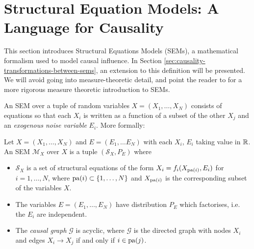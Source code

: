 

\section{Structural Equation Models: A Language for Causality}\label{sec:causality-structural-equation-models}

This section introduces Structural Equations Models (SEMs), a mathematical formalism used to model causal influence. In Section \ref{sec:causality-transformations-between-sems}, an extension to this definition will be presented.
We will avoid going into measure-theoretic detail, and point the reader to \cite{bongers2016structural} for a more rigorous measure theoretic introduction to SEMs.


An SEM over a tuple of random variables $X = (X_1, \ldots, X_N)$ consists of equations so that each $X_i$ is written as a function of a subset of the other $X_j$ and an \emph{exogenous noise variable} $E_i$. More formally:

\medskip

\begin{definition}\label{def:causality-classical-sem}
Let $X = (X_1, \ldots, X_N)$ and $E = (E_1, \ldots E_N)$ with each $X_i$, $E_i$ taking value in $\mathbb{R}$. An SEM $\mathcal{M}_X$ over $X$ is a tuple $(\mathcal{S}_X, P_E)$ where
\begin{itemize}
	\item $\mathcal{S}_X$ is a set of structural equations of the form $X_i = f_i(X_{\operatorname{pa}(i)}, E_i)$ for $i=1,\ldots,N$, where 
$\operatorname{pa}(i) \subset \{1,\ldots,N\}$ and $X_{\operatorname{pa}(i)}$ is the corresponding subset of the variables $X$.
	\item The variables $E = (E_1,\ldots,E_N)$ have distribution $P_E$ which factorises, i.e. the $E_i$ are independent.
	\item The \emph{causal graph} $\mathcal{G}$ is acyclic, where $\mathcal{G}$ is the directed graph with nodes $X_i$ and edges $X_i \to X_j$ if and only if $i \in \operatorname{pa}(j)$.
\end{itemize}
\end{definition}

